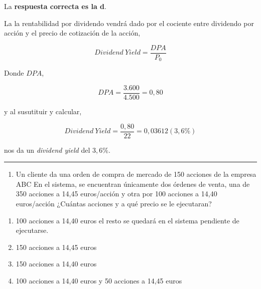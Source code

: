 \documentclass[
  letterpaper,
  DIV=11,
  numbers=noendperiod]{scrreprt}
\providecommand{\tightlist}{%
  \setlength{\itemsep}{0pt}\setlength{\parskip}{0pt}}\usepackage{longtable,booktabs,array}
\begin{document}
\begin{tcolorbox}[enhanced jigsaw, left=2mm, opacityback=0, colback=white, breakable, arc=.35mm, bottomrule=.15mm, rightrule=.15mm, toprule=.15mm, leftrule=.75mm, colframe=quarto-callout-tip-color-frame]
\begin{minipage}[t]{5.5mm}
\textcolor{quarto-callout-tip-color}{\faLightbulb}
\end{minipage}%
\begin{minipage}[t]{\textwidth - 5.5mm}

La \textbf{respuesta correcta es la d}.

La la rentabilidad por dividendo vendrá dado por el cociente entre
dividendo por acción y el precio de cotización de la acción,

\[Dividend\ Yield=\frac{DPA}{P_0}\]

Donde \(DPA\),

\[DPA=\frac{3.600}{4.500}=0,80\]

y al susutituir y calcular,

\[Dividend\ Yield=\frac{0,80}{22}=0,03612(3,6\%)\]

nos da un \emph{dividend yield} del \(3,6\%\).

\end{minipage}%
\end{tcolorbox}

\begin{center}\rule{0.5\linewidth}{0.5pt}\end{center}

\begin{enumerate}
\def\labelenumi{\arabic{enumi}.}
\setcounter{enumi}{74}
\tightlist
\item
  Un cliente da una orden de compra de mercado de 150 acciones de la
  empresa ABC En el sistema, se encuentran únicamente dos órdenes de
  venta, una de 350 acciones a 14,45 euros/acción y otra por 100
  acciones a 14,40 euros/acción ¿Cuántas acciones y a qué precio se le
  ejecutaran?
\end{enumerate}

\begin{enumerate}
\def\labelenumi{\alph{enumi}.}
\item
  100 acciones a 14,40 euros el resto se quedará en el sistema pendiente
  de ejecutarse.
\item
  150 acciones a 14,45 euros
\item
  150 acciones a 14,40 euros
\item
  100 acciones a 14,40 euros y 50 acciones a 14,45 euros
\end{enumerate}
\end{document}
